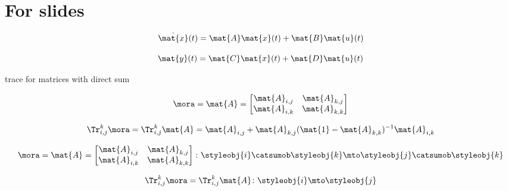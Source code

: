 
\section[For slides]{For slides}

\begin{forslides}

    \begin{equation}
        \label{eq:feedback-000}
        \dot{\mat{x}}(t) = \mat{A} \mat{x}(t) + \mat{B} \mat{u}(t)
    \end{equation}

    \begin{equation}
        \label{eq:feedback-001}
        \mat{y}(t)      = \mat{C}\mat{x}(t) + \mat{D}\mat{u}(t)
    \end{equation}

    trace for matrices with direct sum

    \begin{equation}
        \label{eq:feedback-002}
        \mora = \mat{A} =
        \begin{bmatrix}
            \mat{A}_{i,j} & \mat{A}_{k,j} \\
            \mat{A}_{i,k} & \mat{A}_{k,k}
        \end{bmatrix}
    \end{equation}

    \begin{equation}
        \label{eq:feedback-003}
        \Tr_{i,j}^{k} \mora = \Tr_{i,j}^{k} \mat{A} =  \mat{A}_{i,j} + \mat{A}_{k,j}(\mat{1} - \mat{A}_{k,k})^{-1}\mat{A}_{i,k}
    \end{equation}

    \begin{equation}
        \label{eq:feedback-004}
        \mora = \mat{A} =
        \begin{bmatrix}
            \mat{A}_{i,j} & \mat{A}_{k,j} \\
            \mat{A}_{i,k} & \mat{A}_{k,k}
        \end{bmatrix}
        \colon \styleobj{i} \catsumob \styleobj{k} \mto \styleobj{j} \catsumob \styleobj{k}
    \end{equation}

    \begin{equation}
        \label{eq:feedback-005}
        \Tr_{i,j}^{k} \mora = \Tr_{i,j}^{k} \mat{A} \colon \styleobj{i} \mto \styleobj{j}
    \end{equation}


\end{forslides}
